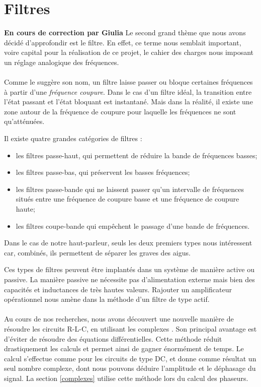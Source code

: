 \section{Filtres}
\Large{\textbf{En cours de correction par Giulia}}
Le second grand thème que nous avons décidé d'approfondir est le filtre. En effet, ce terme nous semblait 
important, voire capital pour la réalisation de ce projet, le cahier des charges nous imposant un réglage 
analogique des fréquences.

\paragraph{}
Comme le suggère son nom, un filtre laisse passer ou bloque certaines fréquences à partir d'une \emph{fréquence coupure}. Dans le cas d'un filtre idéal, la transition entre l'état passant et l'état bloquant est instantané. Mais dans la réalité, il existe une zone autour de la fréquence de coupure pour laquelle les fréquences ne sont qu'atténuées. 

Il existe quatre grandes catégories de filtres \cite{Kularatna} : 
\begin{itemize}
\item les filtres passe-haut, qui permettent de réduire la bande de fréquences basses;
\item les filtres passe-bas, qui préservent les basses fréquences;
\item les filtres passe-bande qui ne laissent passer qu'un intervalle de fréquences situés entre une fréquence de coupure basse et une fréquence de coupure haute;
\item les filtres coupe-bande qui empêchent le passage d'une bande de fréquences.
\end{itemize}
Dans le cas de notre haut-parleur, seuls les deux premiers types nous intéressent car, combinés, ils permettent de séparer les graves des aigus.

Ces types de filtres peuvent être implantés dans un système de manière active ou passive. La manière passive ne nécessite pas d'alimentation externe mais bien des 
capacités et inductances de très hautes valeurs. Rajouter un amplificateur opérationnel nous amène dans la méthode d'un filtre de type actif. \cite{Kularatna}

\paragraph{}
Au cours de nos recherches, nous avons découvert une nouvelle manière de résoudre les circuits R-L-C, en utilisant les 
complexes \cite{Irwin}. Son principal avantage est d'éviter de résoudre des équations différentielles. Cette méthode réduit drastiquement les calculs et permet ainsi de gagner énormément de temps. Le calcul s'effectue comme pour les circuits de type DC, et donne comme résultat un seul nombre complexe, dont nous pouvons déduire l'amplitude et le déphasage du signal.
La section \ref{complexes} utilise cette méthode lors du calcul des phaseurs. 
